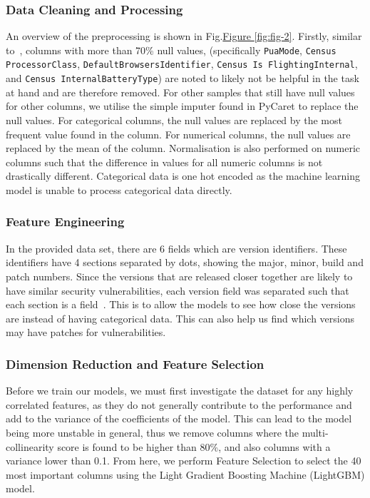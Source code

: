 \documentclass[pdflatex,sn-basic,Numbered]{sn-jnl}%
\theoremstyle{thmstyleone}%
\theoremstyle{thmstyletwo}%
\theoremstyle{thmstylethree}%
\newcommand{\reffig}[1]{\hyperref[#1]{Figure \ref*{#1}}}
\begin{document}
\subsubsection{Data Cleaning and Processing} 
An overview of the preprocessing is shown in Fig.\reffig{fig:fig-2}.
Firstly, similar to~\cite{shahini2019}, columns with more than 70\% null values, {(specifically \texttt{PuaMode}, \texttt{Census
ProcessorClass}, \texttt{DefaultBrowsersIdentifier}, \texttt{Census Is FlightingInternal}, and \texttt{Census InternalBatteryType})} are noted to likely not be helpful in the task at hand and are therefore removed.
For other samples that still have null values for other columns, we utilise the simple imputer found in PyCaret to replace the null values.
For categorical columns, the null values are replaced by the most frequent value found in the column.
For numerical columns, the null values are replaced by the mean of the column.
Normalisation is also performed on numeric columns such that the difference in values for all numeric columns is not drastically different.
Categorical data is one hot encoded as the machine learning model is unable to process categorical data directly.

\subsubsection{Feature Engineering} 
In the provided data set, there are 6 fields which are version identifiers.
These identifiers have 4 sections separated by dots, showing the major, minor, build and patch numbers.
Since the versions that are released closer together are likely to have similar security vulnerabilities, each version field was separated such that each section is a field~\cite{iop2020}.
This is to allow the models to see how close the versions are instead of having categorical data.
This can also help us find which versions may have patches for vulnerabilities.

\subsubsection{Dimension Reduction and Feature Selection}
Before we train our models, we must first investigate the dataset for any highly correlated features, as they do not generally contribute to the performance and add to the variance of the coefficients of the model.
This can lead to the model being more unstable in general, thus we remove columns where the multi-collinearity score is found to be higher than 80\%, and also columns with a variance lower than 0.1. From here, we perform Feature Selection to select the 40 most important columns using the Light Gradient Boosting Machine (LightGBM) model.
\end{document}
